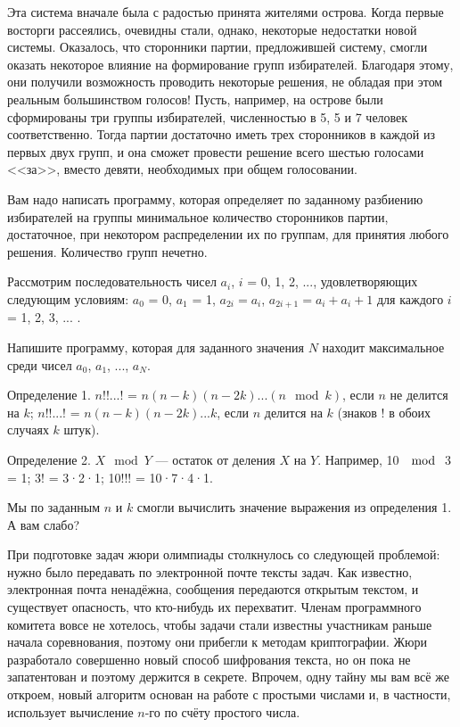 Эта система вначале была с радостью принята жителями острова. Когда первые восторги рассеялись, очевидны стали, однако, некоторые недостатки новой системы. Оказалось, что сторонники партии, предложившей систему, смогли оказать некоторое влияние на формирование групп избирателей. Благодаря этому, они получили возможность проводить некоторые решения, не обладая при этом реальным большинством голосов!
Пусть, например, на острове были сформированы три группы избирателей, численностью в 5, 5 и 7 человек соответственно. Тогда партии достаточно иметь трех сторонников в каждой из первых двух групп, и она сможет провести решение всего шестью голосами <<за>>, вместо девяти, необходимых при общем голосовании.

Вам надо написать программу, которая определяет по заданному разбиению избирателей на группы минимальное количество сторонников партии, достаточное, при некотором распределении их по группам, для принятия любого решения. Количество групп нечетно.

\z Рассмотрим последовательность чисел $a_i$, $i$ = 0, 1, 2, ..., удовлетворяющих следующим условиям:
$a_0$ = 0, $a_1$ = 1, $a_{2i} = a_i$, $a_{2i + 1} = a_i + a_i + 1$ для каждого $i$ = 1, 2, 3, ... .

Напишите программу, которая для заданного значения $N$ находит максимальное среди чисел $a_0$, $a_1$, ..., $a_N$.

\z Определение 1. $n$!!...! = $n(n-k)(n-2k)...(n \mod k)$, если $n$ не делится на $k$; $n$!!...! = $n(n-k)(n-2k)...k$, если $n$ делится на $k$ (знаков ! в обоих случаях $k$ штук).

Определение 2. $X \mod Y$ --- остаток от деления $X$ на $Y$. Например, 10 $\mod$ 3 = 1; 3! = 3·2·1; 10!!! = 10·7·4·1.

Мы по заданным $n$ и $k$ смогли вычислить значение выражения из определения 1. А вам слабо?

\z При подготовке задач жюри олимпиады столкнулось со следующей проблемой: нужно было передавать по электронной почте тексты задач. Как известно, электронная почта ненадёжна, сообщения передаются открытым текстом, и существует опасность, что кто-нибудь их перехватит. Членам программного комитета вовсе не хотелось, чтобы задачи стали известны участникам раньше начала соревнования, поэтому они прибегли к методам криптографии. Жюри разработало совершенно новый способ шифрования текста, но он пока не запатентован и поэтому держится в секрете. Впрочем, одну тайну мы вам всё же откроем, новый алгоритм основан на работе с простыми числами и, в частности, использует вычисление $n$-го по счёту простого числа.

